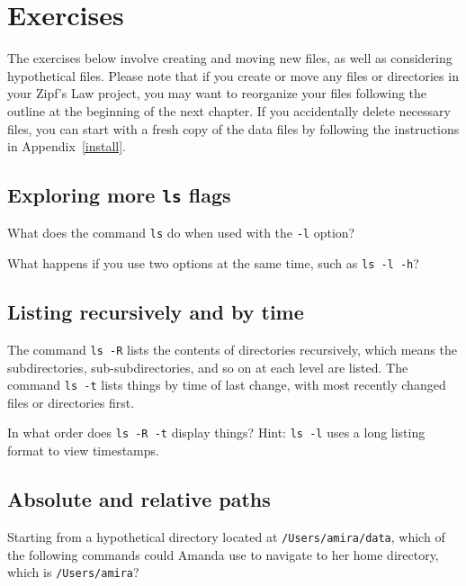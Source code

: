\documentclass[
]{krantz}
\begin{document}
\hypertarget{bash-basics-exercises}{%
\section{Exercises}\label{bash-basics-exercises}}

The exercises below involve creating and moving new files,
as well as considering hypothetical files.
Please note that if you create or move any files or directories in your Zipf's Law project,
you may want to reorganize your files following the outline at the beginning of the next chapter.
If you accidentally delete necessary files,
you can start with a fresh copy of the data files
by following the instructions in Appendix~\ref{install}.

\hypertarget{bash-basics-ex-more-ls}{%
\subsection{\texorpdfstring{Exploring more \texttt{ls} flags}{Exploring more ls flags}}\label{bash-basics-ex-more-ls}}

What does the command \texttt{ls} do when used
with the \texttt{-l} option?

What happens if you use two options at the same time, such as \texttt{ls\ -l\ -h}?

\hypertarget{bash-basics-ex-ls-rt}{%
\subsection{Listing recursively and by time}\label{bash-basics-ex-ls-rt}}

The command \texttt{ls\ -R} lists the contents of directories recursively,
which means the subdirectories, sub-subdirectories, and so on at each level are listed.
The command \texttt{ls\ -t} lists things by time of last change,
with most recently changed files or directories first.

In what order does \texttt{ls\ -R\ -t} display things? Hint: \texttt{ls\ -l} uses a long listing
format to view timestamps.

\hypertarget{bash-basics-ex-paths}{%
\subsection{Absolute and relative paths}\label{bash-basics-ex-paths}}

Starting from a hypothetical directory located at \texttt{/Users/amira/data},
which of the following commands could Amanda use to navigate to her home directory,
which is \texttt{/Users/amira}?
\end{document}
